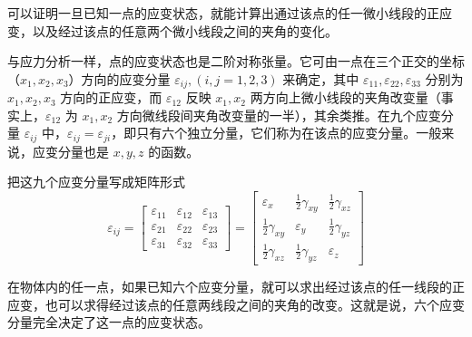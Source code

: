\documentclass[12pt,a4paper]{article}
\begin{document}
可以证明一旦已知一点的应变状态，就能计算出通过该点的任一微小线段的正应变，以及经过该点的任意两个微小线段之间的夹角的变化。

与应力分析一样，点的应变状态也是二阶对称张量。它可由一点在三个正交的坐标（$x_1,x_2,x_3$）方向的应变分量 $\varepsilon_{ij},(i,j=1,2,3)$ 来确定，其中 $\varepsilon_{11},\varepsilon_{22},\varepsilon_{33}$ 分别为 $x_1,x_2,x_3$ 方向的正应变，而 $\varepsilon_{12}$ 反映 $x_1,x_2$ 两方向上微小线段的夹角改变量（事实上，$\varepsilon_{12}$ 为 $x_1,x_2$ 方向微线段间夹角改变量的一半），其余类推。在九个应变分量 $\varepsilon_{ij}$ 中，$\varepsilon_{ij}=\varepsilon_{ji}$，即只有六个独立分量，它们称为在该点的应变分量。一般来说，应变分量也是 $x,y,z$ 的函数。

把这九个应变分量写成矩阵形式
$$
\varepsilon_{ij}=
\begin{bmatrix}
\varepsilon_{11} & \varepsilon_{12} & \varepsilon_{13} \\
\varepsilon_{21} & \varepsilon_{22} & \varepsilon_{23} \\
\varepsilon_{31} & \varepsilon_{32} & \varepsilon_{33}
\end{bmatrix}=
\begin{bmatrix}
\varepsilon_{x} & \frac{1}{2}\gamma_{xy} & \frac{1}{2}\gamma_{xz} \\
\frac{1}{2}\gamma_{xy} & \varepsilon_{y} & \frac{1}{2}\gamma_{yz} \\
\frac{1}{2}\gamma_{xz} & \frac{1}{2}\gamma_{yz} & \varepsilon_{z}
\end{bmatrix}
$$

在物体内的任一点，如果已知六个应变分量，就可以求出经过该点的任一线段的正应变，也可以求得经过该点的任意两线段之间的夹角的改变。这就是说，六个应变分量完全决定了这一点的应变状态。
\end{document}
